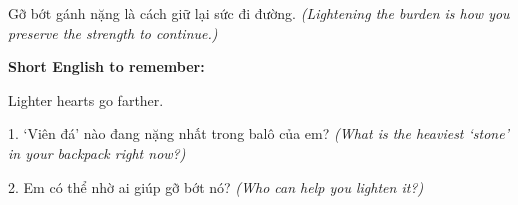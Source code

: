 \begin{baihoc}
Gỡ bớt gánh nặng là cách giữ lại sức đi đường.
\textit{(Lightening the burden is how you preserve the strength to continue.)}
\end{baihoc}

\begin{ghinhoanh}
\textbf{Short English to remember:}

Lighter hearts go farther.

\end{ghinhoanh}

\begin{tuhocnhanh}
1. `Viên đá' nào đang nặng nhất trong balô của em? \textit{(What is the heaviest `stone' in your backpack right now?)}

2. Em có thể nhờ ai giúp gỡ bớt nó? \textit{(Who can help you lighten it?)}
\end{tuhocnhanh}
\ngancach